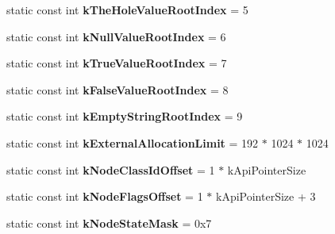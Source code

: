 \begin{DoxyCompactItemize}
\item 
static const int {\bfseries k\+The\+Hole\+Value\+Root\+Index} = 5\hypertarget{classv8_1_1internal_1_1Internals_ac07a35d3efef0c107062b3eb88696e31}{}\label{classv8_1_1internal_1_1Internals_ac07a35d3efef0c107062b3eb88696e31}

\item 
static const int {\bfseries k\+Null\+Value\+Root\+Index} = 6\hypertarget{classv8_1_1internal_1_1Internals_ab311cf753ec5c968052bd83ef21e83f8}{}\label{classv8_1_1internal_1_1Internals_ab311cf753ec5c968052bd83ef21e83f8}

\item 
static const int {\bfseries k\+True\+Value\+Root\+Index} = 7\hypertarget{classv8_1_1internal_1_1Internals_a93abd58b178eca469bade28e68b5c59e}{}\label{classv8_1_1internal_1_1Internals_a93abd58b178eca469bade28e68b5c59e}

\item 
static const int {\bfseries k\+False\+Value\+Root\+Index} = 8\hypertarget{classv8_1_1internal_1_1Internals_a90b6837aa368bbe4ffd914e6f753b167}{}\label{classv8_1_1internal_1_1Internals_a90b6837aa368bbe4ffd914e6f753b167}

\item 
static const int {\bfseries k\+Empty\+String\+Root\+Index} = 9\hypertarget{classv8_1_1internal_1_1Internals_a6f669f3d98fe653b281b26be3bc0655a}{}\label{classv8_1_1internal_1_1Internals_a6f669f3d98fe653b281b26be3bc0655a}

\item 
static const int {\bfseries k\+External\+Allocation\+Limit} = 192 $\ast$ 1024 $\ast$ 1024\hypertarget{classv8_1_1internal_1_1Internals_aa88e5a295f86584aa3e90ebc1a6c4739}{}\label{classv8_1_1internal_1_1Internals_aa88e5a295f86584aa3e90ebc1a6c4739}

\item 
static const int {\bfseries k\+Node\+Class\+Id\+Offset} = 1 $\ast$ k\+Api\+Pointer\+Size\hypertarget{classv8_1_1internal_1_1Internals_af4fb6d499cb87f03031ad4d6be6bcd8f}{}\label{classv8_1_1internal_1_1Internals_af4fb6d499cb87f03031ad4d6be6bcd8f}

\item 
static const int {\bfseries k\+Node\+Flags\+Offset} = 1 $\ast$ k\+Api\+Pointer\+Size + 3\hypertarget{classv8_1_1internal_1_1Internals_aee5606f2a44d43d8dafe344e0bb753ef}{}\label{classv8_1_1internal_1_1Internals_aee5606f2a44d43d8dafe344e0bb753ef}

\item 
static const int {\bfseries k\+Node\+State\+Mask} = 0x7\hypertarget{classv8_1_1internal_1_1Internals_a853acc088978d38a5a69091cf857a46d}{}\label{classv8_1_1internal_1_1Internals_a853acc088978d38a5a69091cf857a46d}


\end{DoxyCompactItemize}
